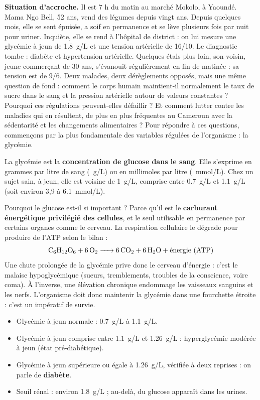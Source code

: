 \documentclass[11pt]{article}
\newcommand{\cle}[1]{{\popxbold\color{popdark}#1}}
\newcounter{popsec}
\newcounter{popsub}
\newcommand{\courssub}[1]{%
  \stepcounter{popsub}%
  \par\vspace{9pt}\noindent{\popxbold\fontsize{11.5}{13}\selectfont\color{popink}{\color{poporange}\thepopsec.\thepopsub}\hspace{6pt}#1}\par\nopagebreak\vspace{4pt}
}
\begin{document}
\textbf{Situation d'accroche.} Il est 7 h du matin au marché Mokolo, à Yaoundé. Mama Ngo Bell, 52 ans, vend des légumes depuis vingt ans. Depuis quelques mois, elle se sent épuisée, a soif en permanence et se lève plusieurs fois par nuit pour uriner. Inquiète, elle se rend à l'hôpital de district : on lui mesure une glycémie à jeun de \SI{1,8}{g/L} et une tension artérielle de 16/10. Le diagnostic tombe : diabète et hypertension artérielle. Quelques étals plus loin, son voisin, jeune commerçant de 30 ans, s'évanouit régulièrement en fin de matinée : sa tension est de 9/6. Deux malades, deux dérèglements opposés, mais une même question de fond : comment le corps humain maintient-il normalement le taux de sucre dans le sang et la pression artérielle autour de valeurs constantes ? Pourquoi ces régulations peuvent-elles défaillir ? Et comment lutter contre les maladies qui en résultent, de plus en plus fréquentes au Cameroun avec la sédentarité et les changements alimentaires ? Pour répondre à ces questions, commençons par la plus fondamentale des variables régulées de l'organisme : la \cle{glycémie}.

\courssub{La glycémie : définition et valeur normale}

\begin{definition}[La glycémie]
La \cle{glycémie} est la \textbf{concentration de glucose dans le sang}. Elle s'exprime en grammes par litre de sang (\SI{}{g/L}) ou en millimoles par litre (\SI{}{mmol/L}). Chez un sujet sain, à jeun, elle est voisine de \SI{1}{g/L}, comprise entre \SI{0,7}{g/L} et \SI{1,1}{g/L} (soit environ 3,9 à \SI{6,1}{mmol/L}).
\end{definition}

Pourquoi le glucose est-il si important ? Parce qu'il est le \textbf{carburant énergétique privilégié des cellules}, et le seul utilisable en permanence par certains organes comme le cerveau. La respiration cellulaire le dégrade pour produire de l'ATP selon le bilan :
\[ \ce{C6H12O6 + 6O2 -> 6CO2 + 6H2O} + \text{énergie (ATP)} \]
Une chute prolongée de la glycémie prive donc le cerveau d'énergie : c'est le malaise hypoglycémique (sueurs, tremblements, troubles de la conscience, voire coma). À l'inverse, une élévation chronique endommage les vaisseaux sanguins et les nerfs. L'organisme doit donc maintenir la glycémie dans une fourchette étroite : c'est un impératif de survie.

\begin{exemplebox}
\begin{itemize}
\item Glycémie à jeun normale : \SI{0,7}{g/L} à \SI{1,1}{g/L}.
\item Glycémie à jeun comprise entre \SI{1,1}{g/L} et \SI{1,26}{g/L} : hyperglycémie modérée à jeun (état pré-diabétique).
\item Glycémie à jeun supérieure ou égale à \SI{1,26}{g/L}, vérifiée à deux reprises : on parle de \textbf{diabète}.
\item Seuil rénal : environ \SI{1,8}{g/L} ; au-delà, du glucose apparaît dans les urines.
\end{itemize}
\end{exemplebox}
\end{document}

